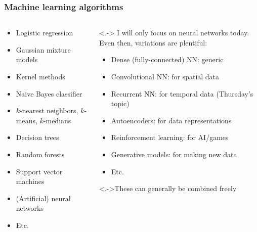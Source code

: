 \begin{frame}
    \frametitle{Machine learning algorithms}

    \begin{columns}
        \begin{column}{0.44\textwidth}
            \begin{itemize}[<.->]
                \item Logistic regression
                \item Gaussian mixture models
                \item Kernel methods
                \item Naive Bayes classifier
                \item $k$-nearest neighbors, $k$-means, $k$-medians
                \item Decision trees
                \item Random forests
                \item Support vector machines
                \item \alert<+->{(Artificial) neural networks}
                \item Etc.
            \end{itemize}
        \end{column}

        \begin{column}{0.56\textwidth}
            \uncover<.->{%
                I will only focus on neural networks today.
                Even then, variations are plentiful:
            }
            \begin{itemize}[<.->]
                \item \alert<3->{Dense (fully-connected) NN: generic}
                \item Convolutional NN: for spatial data
                \item \alert<3->{Recurrent NN: for temporal data (Thursday's topic)}
                \item Autoencoders: for data representations
                \item Reinforcement learning: for AI/games
                \item Generative models: for making new data
                \item Etc.
            \end{itemize}
            \uncover<.->{These can generally be combined freely}
        \end{column}
    \end{columns}
\end{frame}

